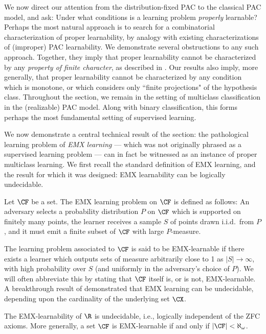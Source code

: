 \documentclass[11pt]{article}
\begin{document}
We now direct our attention from the distribution-fixed PAC to the classical PAC model, and ask: Under what conditions is a learning problem \emph{properly} learnable? Perhaps the most natural approach is to search for a combinatorial characterization of proper learnability, by analogy with existing characterizations of (improper) PAC learnability. We demonstrate several obstructions to any such approach. Together, they imply that proper learnability cannot be characterized by any \emph{property of finite character}, as described in \citet{ben2019learnability}. Our results also imply, more generally, that proper learnability cannot be characterized by any condition which is monotone, or which considers only ``finite projections" of the hypothesis class. Throughout the section, we remain in the setting of multiclass classification in the (realizable) PAC model. Along with binary classification, this forms perhaps the most fundamental setting of supervised learning. 

We now demonstrate a central technical result of the section: the pathological learning problem of \emph{EMX learning} --- which was not originally phrased as a supervised learning problem \citep{ben2019learnability} --- can in fact be witnessed as an instance of proper multiclass learning. We first recall the standard definition of EMX learning, and the result for which it was designed: EMX learnability can be logically undecidable. 

\begin{definition}
Let $\CF$ be a set. The EMX learning problem on $\CF$ is defined as follows: An adversary selects a probability distribution $P$ on $\CF$ which is supported on finitely many points, the learner receives a sample $S$ of points drawn i.i.d.\ from $P$, and it must emit a finite subset of $\CF$ with large $P$-measure. 
\end{definition}

The learning problem associated to $\CF$ is said to be EMX-learnable if there exists a learner which outputs sets of measure arbitrarily close to 1 as $|S| \to \infty$, with high probability over $S$ (and uniformly in the adversary's choice of $P$). We will often abbreviate this by stating that $\CF$ itself is, or is not, EMX-learnable. A breakthrough result of \citet{ben2019learnability} demonstrated that EMX learning can be undecidable, depending upon the cardinality of the underlying set $\CX$. 

\begin{theorem}\label{Theorem:EMX-undecidable}
The EMX-learnability of $\R$ is undecidable, i.e., logically independent of the ZFC axioms. More generally, a set $\CF$ is EMX-learnable if and only if $|\CF| < \aleph_{\omega}$.
\end{theorem}
\end{document}
